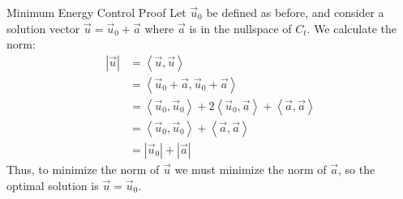 \begin{frame}{Minimum Energy Control Proof}
	Let $\vec{u}_0$ be defined as before, and consider a solution vector $\vec{u} = \vec{u}_0 + \vec{a}$ where $\vec{a}$ is in the nullspace of $C_t$. We calculate the norm:
	\begin{align*}
	\left| \vec{u} \right| 
	& = \left< \vec{u}, \vec{u} \right> 
	\\ &= \left< \vec{u}_0 + \vec{a}, \vec{u}_0 + \vec{a} \right> 
	\\ &= \left< \vec{u}_0, \vec{u}_0 \right>  + 2\left< \vec{u}_0, \vec{a} \right>  + \left< \vec{a}, \vec{a} \right> 
	\\ &= \left< \vec{u}_0, \vec{u}_0 \right>  + \left< \vec{a}, \vec{a} \right> 
	\\ &= \left| \vec{u}_0 \right| + \left| \vec{a} \right| 
	\end{align*}
	Thus, to minimize the norm of $\vec{u}$ we must minimize the norm of $\vec{a}$, so the optimal solution is $\vec{u} = \vec{u}_0$.
\end{frame}